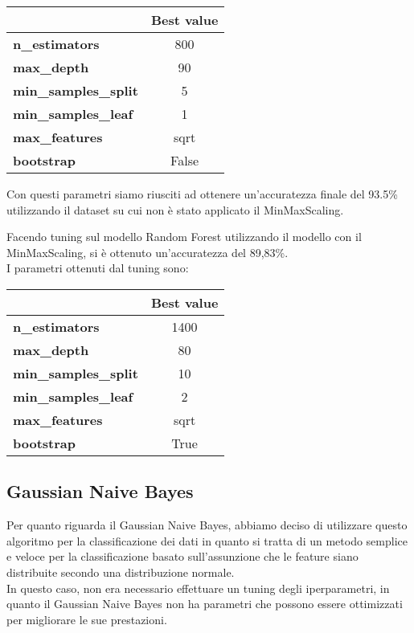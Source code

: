 \documentclass[../../Report.tex]{subfiles}
\begin{document}
\begin{table}[H]
    \centering
    \begin{tabular}{|l|c|}
        \hline
        & \textbf{Best value} \\
        \hline
        \textbf{n\_estimators} & 800 \\
        \hline
        \textbf{max\_depth} & 90 \\
        \hline
        \textbf{min\_samples\_split} & 5 \\
        \hline
        \textbf{min\_samples\_leaf} & 1 \\
        \hline
        \textbf{max\_features} & sqrt \\
        \hline
        \textbf{bootstrap} & False \\
        \hline
    \end{tabular}
\end{table}

Con questi parametri siamo riusciti ad ottenere un'accuratezza finale del 93.5\% utilizzando il dataset su cui non è stato applicato il MinMaxScaling.

Facendo tuning sul modello Random Forest utilizzando il modello con il MinMaxScaling, si è ottenuto un'accuratezza del 89,83\%.\\
I parametri ottenuti dal tuning sono:

\begin{table}[H]
    \centering
    \begin{tabular}{|l|c|}
        \hline
        & \textbf{Best value} \\
        \hline
        \textbf{n\_estimators} & 1400 \\
        \hline
        \textbf{max\_depth} & 80 \\
        \hline
        \textbf{min\_samples\_split} & 10 \\
        \hline
        \textbf{min\_samples\_leaf} & 2 \\
        \hline
        \textbf{max\_features} & sqrt \\
        \hline
        \textbf{bootstrap} & True \\
        \hline
    \end{tabular}
\end{table}

\subsection{Gaussian Naive Bayes}
Per quanto riguarda il Gaussian Naive Bayes, abbiamo deciso di utilizzare questo algoritmo per la classificazione dei dati in quanto si tratta di un metodo semplice e veloce per la classificazione basato sull'assunzione che le feature siano distribuite secondo una distribuzione normale.\\
In questo caso, non era necessario effettuare un tuning degli iperparametri, in quanto il Gaussian Naive Bayes non ha parametri che possono essere ottimizzati per migliorare le sue prestazioni.
\end{document}
